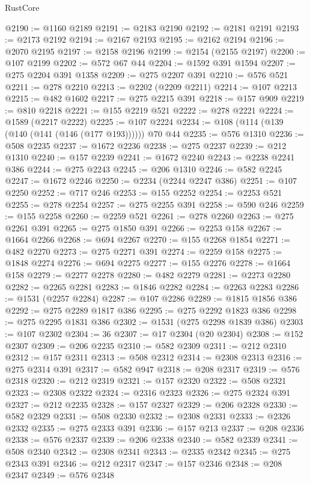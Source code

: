 \begin{lexlean}{RustCore}
\begin{coremodule}
@2190 := @1160 @2189
@2191 := @2183 @2190
@2192 := @2181 @2191
@2193 := @2173 @2192
@2194 := @2167 @2193
@2195 := @2162 @2194
@2196 := @2070 @2195
@2197 := @2158 @2196
@2199 := @2154 (@2155 @2197)
@2200 := @107 @2199
@2202 := @572 @67 @44
@2204 := @1592 @391 @1594
@2207 := @275 @2204 @391 @1358
@2209 := @275 @2207 @391
@2210 := @576 @521
@2211 := @278 @2210
@2213 := @2202 (@2209 @2211)
@2214 := @107 @2213
@2215 := @482 @1602
@2217 := @275 @2215 @391
@2218 := @157 @909
@2219 := @810 @2218
@2221 := @155 @2219 @521
@2222 := @278 @2221
@2224 := @1589 (@2217 @2222)
@2225 := @107 @2224
@2234 := @108 (@114 (@139 (@140 (@141 (@146 (@177 @193)))))) @70 @44
@2235 := @576 @1310
@2236 := @508 @2235
@2237 := @1672 @2236
@2238 := @275 @2237
@2239 := @212 @1310
@2240 := @157 @2239
@2241 := @1672 @2240
@2243 := @2238 @2241 @386
@2244 := @275 @2243
@2245 := @206 @1310
@2246 := @582 @2245
@2247 := @1672 @2246
@2250 := @2234 (@2244 @2247 @386)
@2251 := @107 @2250
@2252 := @717 @246
@2253 := @155 @2252
@2254 := @2253 @521
@2255 := @278 @2254
@2257 := @275 @2255 @391
@2258 := @590 @246
@2259 := @155 @2258
@2260 := @2259 @521
@2261 := @278 @2260
@2263 := @275 @2261 @391
@2265 := @275 @1850 @391
@2266 := @2253 @158
@2267 := @1664 @2266
@2268 := @694 @2267
@2270 := @155 @2268 @1854
@2271 := @482 @2270
@2273 := @275 @2271 @391
@2274 := @2259 @158
@2275 := @1848 @2274
@2276 := @694 @2275
@2277 := @155 @2276
@2278 := @1664 @158
@2279 := @2277 @2278
@2280 := @482 @2279
@2281 := @2273 @2280
@2282 := @2265 @2281
@2283 := @1846 @2282
@2284 := @2263 @2283
@2286 := @1531 (@2257 @2284)
@2287 := @107 @2286
@2289 := @1815 @1856 @386
@2292 := @275 @2289 @1817 @386
@2295 := @275 @2292 @1823 @386
@2298 := @275 @2295 @1831 @386
@2302 := @1531 (@275 @2298 @1839 @386)
@2303 := @107 @2302
@2304 := 36
@2307 := @17 @2304 (@20 @2304)
@2308 := @152 @2307
@2309 := @206 @2235
@2310 := @582 @2309
@2311 := @212 @2310
@2312 := @157 @2311
@2313 := @508 @2312
@2314 := @2308 @2313
@2316 := @275 @2314 @391
@2317 := @582 @947
@2318 := @208 @2317
@2319 := @576 @2318
@2320 := @212 @2319
@2321 := @157 @2320
@2322 := @508 @2321
@2323 := @2308 @2322
@2324 := @2316 @2323
@2326 := @275 @2324 @391
@2327 := @212 @2235
@2328 := @157 @2327
@2329 := @206 @2328
@2330 := @582 @2329
@2331 := @508 @2330
@2332 := @2308 @2331
@2333 := @2326 @2332
@2335 := @275 @2333 @391
@2336 := @157 @213
@2337 := @208 @2336
@2338 := @576 @2337
@2339 := @206 @2338
@2340 := @582 @2339
@2341 := @508 @2340
@2342 := @2308 @2341
@2343 := @2335 @2342
@2345 := @275 @2343 @391
@2346 := @212 @2317
@2347 := @157 @2346
@2348 := @208 @2347
@2349 := @576 @2348

\end{coremodule}
\end{lexlean}
